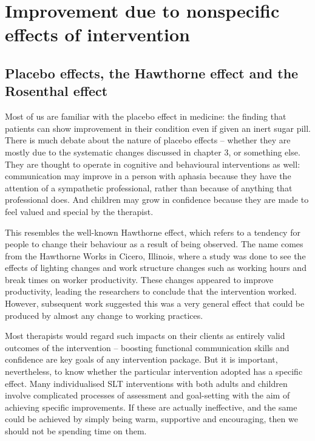 \documentclass[]{book}
\begin{document}
\hypertarget{improvement-due-to-nonspecific-effects-of-intervention}{%
\chapter{Improvement due to nonspecific effects of intervention}\label{improvement-due-to-nonspecific-effects-of-intervention}}

\hypertarget{placebo-effects-the-hawthorne-effect-and-the-rosenthal-effect}{%
\section{Placebo effects, the Hawthorne effect and the Rosenthal effect}\label{placebo-effects-the-hawthorne-effect-and-the-rosenthal-effect}}

Most of us are familiar with the placebo effect in medicine: the finding that patients can show improvement in their condition even if given an inert sugar pill. There is much debate about the nature of placebo effects -- whether they are mostly due to the systematic changes discussed in chapter 3, or something else. They are thought to operate in cognitive and behavioural interventions as well: communication may improve in a person with aphasia because they have the attention of a sympathetic professional, rather than because of anything that professional does. And children may grow in confidence because they are made to feel valued and special by the therapist.

This resembles the well-known Hawthorne effect, which refers to a tendency for people to change their behaviour as a result of being observed. The name comes from the Hawthorne Works in Cicero, Illinois, where a study was done to see the effects of lighting changes and work structure changes such as working hours and break times on worker productivity. These changes appeared to improve productivity, leading the researchers to conclude that the intervention worked. However, subsequent work suggested this was a very general effect that could be produced by almost any change to working practices.

Most therapists would regard such impacts on their clients as entirely valid outcomes of the intervention -- boosting functional communication skills and confidence are key goals of any intervention package. But it is important, nevertheless, to know whether the particular intervention adopted has a specific effect. Many individualised SLT interventions with both adults and children involve complicated processes of assessment and goal-setting with the aim of achieving specific improvements. If these are actually ineffective, and the same could be achieved by simply being warm, supportive and encouraging, then we should not be spending time on them.
\end{document}
